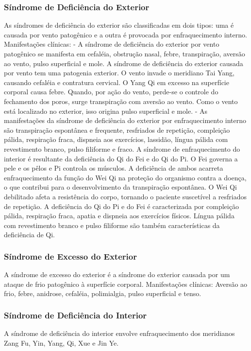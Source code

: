 \documentclass[12pt,oneside,a4paper]{book} %
\begin{document}
\subsubsection{Síndrome de Deficiência do Exterior} 
As síndromes de deficiência do exterior são classificadas em dois tipos: uma é causada por vento patogênico e a outra é provocada por enfraquecimento interno.
Manifestações clínicas:
- A síndrome de deficiência do exterior por vento patogênico se manifesta em cefaléia, obstrução nasal, febre, transpiração, aversão ao vento, pulso superficial e mole. A síndrome de deficiência do exterior causada por vento tem uma patogenia exterior. O vento invade o meridiano Tai Yang, causando cefaléia e contratura cervical. O Yang Qi em excesso na superfície corporal causa febre. Quando, por ação do vento, perde-se o controle do fechamento dos poros, surge transpiração com aversão ao vento. Como o vento está localizado no exterior, isso origina pulso superficial e mole.
- As manifestações da síndrome de deficiência do exterior por enfraquecimento interno são transpiração espontânea e frequente, resfriados de repetição, compleição pálida, respiração fraca, dispneia aos exercícios, lassidão, língua pálida com revestimento branco, pulso filiforme e fraco. A síndrome de enfraquecimento do interior é resultante da deficiência do Qi do Fei e do Qi do Pi. O Fei governa a pele e os pêlos e Pi controla os músculos. A deficiência de ambos acarreta enfraquecimento da função do Wei Qi na proteção do organismo contra a doença, o que contribui para o desenvolvimento da transpiração espontânea. O Wei Qi debilitado afeta a resistência do corpo, tornando o paciente suscetível a resfriados de repetição. A deficiência do Qi do Pi e do Fei é caracterizada por compleição pálida, respiração fraca, apatia e dispneia aos exercícios físicos. Língua pálida com revestimento branco e pulso filiforme são também características da deficiência de Qi.

\subsubsection{Síndrome de Excesso do Exterior}
A síndrome de excesso do exterior é a síndrome do exterior causada por um ataque de frio patogênico à superfície corporal.
Manifestações clínicas: Aversão ao frio, febre, anidrose, cefaléia, polimialgia, pulso superficial e tenso.

\subsubsection{Síndrome de Deficiência do Interior}
A síndrome de deficiência do interior envolve enfraquecimento dos meridianos Zang Fu, Yin, Yang, Qi, Xue e Jin Ye. 
\end{document}
